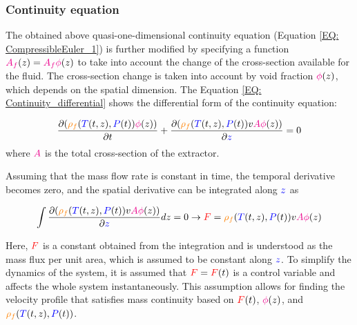 \documentclass[../Article_Model_Parameters.tex]{subfiles}
\begin{document}
		
	\subsubsection{Continuity equation} \label{CH: Continuity}
	The obtained above quasi-one-dimensional continuity equation (Equation \ref{EQ: CompressibleEuler_1}) is further modified by specifying a function ${\color{magenta}A_f}(z) = {\color{magenta}A_f\phi}(z)$ to take into account the change of the cross-section available for the fluid. The cross-section change is taken into account by void fraction ${\color{magenta}\phi}(z)$, which depends on the spatial dimension. The Equation \ref{EQ: Continuity_differential} shows the differential form of the continuity equation: 
	
	{\footnotesize
		\begin{equation} \label{EQ: Continuity_differential}
			\frac{\partial ({\color{orange}\rho_f}({\color{blue}T}(t,z),{\color{blue}P}(t)) {\color{magenta}\phi}(z))}{\partial t} + \frac{\partial ({\color{orange}\rho_f}({\color{blue}T}(t,z),{\color{blue}P}(t)) v {\color{magenta}A\phi}(z))}{\partial {\color{blue}z}} = 0
		\end{equation}
	}
	where ${\color{magenta} A}$ is the total cross-section of the extractor.
	
	
	Assuming that the mass flow rate is constant in time, the temporal derivative becomes zero, and the spatial derivative can be integrated along ${\color{blue}z}$ as
	
	{\footnotesize
		\begin{equation} \label{EQ:Velocity}
			\int \frac{\partial ({\color{orange}\rho_f}({\color{blue}T}(t,z),{\color{blue}P}(t)) v {\color{magenta}A \phi}(z) )}{\partial {\color{blue}z}} dz = 0 \rightarrow {\color{red}F}={\color{orange}\rho_f}({\color{blue}T}(t,z),{\color{blue}P}(t)) v {\color{magenta}A\phi}(z)
		\end{equation}
	}
	
	Here, ${\color{red}F}$ is a constant obtained from the integration and is understood as the mass flux per unit area, which is assumed to be constant along ${\color{blue}z}$. To simplify the dynamics of the system, it is assumed that ${\color{red}F}={\color{red}F}(t)$ is a control variable and affects the whole system instantaneously. This assumption allows for finding the velocity profile that satisfies mass continuity based on ${\color{red}F}(t)$, ${\color{magenta}\phi}(z)$, and ${\color{orange}\rho_f}({\color{blue}T}(t,z),{\color{blue}P}(t))$.
	
\end{document}
